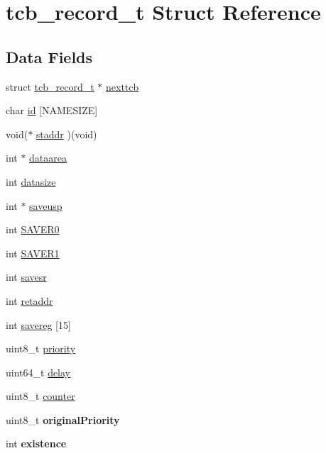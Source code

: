 \hypertarget{structtcb__record__t}{}\section{tcb\+\_\+record\+\_\+t Struct Reference}
\label{structtcb__record__t}
\subsection*{Data Fields}
\begin{DoxyCompactItemize}
\item 
struct \hyperlink{structtcb__record__t}{tcb\+\_\+record\+\_\+t} $\ast$ \hyperlink{structtcb__record__t_abe5f58939c000c4f6b06c911bead561c}{nexttcb}
\item 
char \hyperlink{structtcb__record__t_aa25efaaaecf8c7c4d679dbc94aec3031}{id} \mbox{[}N\+A\+M\+E\+S\+I\+Z\+E\mbox{]}
\item 
void($\ast$ \hyperlink{structtcb__record__t_a99e7583ffff142dbd9efb8d9c1d8ebde}{staddr} )(void)
\item 
int $\ast$ \hyperlink{structtcb__record__t_a994219890a698cd01cb7a730d0b34a5a}{dataarea}
\item 
int \hyperlink{structtcb__record__t_aceef3706b1186c624f339e303d4ae373}{datasize}
\item 
int $\ast$ \hyperlink{structtcb__record__t_ad2fffaf0f5616d3f34ab2336a25a9186}{saveusp}
\item 
int \hyperlink{structtcb__record__t_a753e67212cb8cd447171d33a8e75c11e}{S\+A\+V\+E\+R0}
\item 
int \hyperlink{structtcb__record__t_a1137e438d580c22c21044a334356b696}{S\+A\+V\+E\+R1}
\item 
int \hyperlink{structtcb__record__t_a4b57f27f8be80d5cedeb6e3a7a759d18}{savesr}
\item 
int \hyperlink{structtcb__record__t_a3a7c64427bddbb6ef8ac755f2782baf7}{retaddr}
\item 
int \hyperlink{structtcb__record__t_a22aa27436be4418c5ad79657a2128b0e}{savereg} \mbox{[}15\mbox{]}
\item 
uint8\+\_\+t \hyperlink{structtcb__record__t_a6a5183df4c54c3e28dc8dc704f2487d5}{priority}
\item 
uint64\+\_\+t \hyperlink{structtcb__record__t_a5b1f6f1eaa44ff5c4f80c23687f4f324}{delay}
\item 
uint8\+\_\+t \hyperlink{structtcb__record__t_a61f7b3cbcedea4bae0c663c892d5d07f}{counter}
\item 
\hypertarget{structtcb__record__t_a6cf25c65c6d8a6fad1172539d85d0304}{}uint8\+\_\+t {\bfseries original\+Priority}\label{structtcb__record__t_a6cf25c65c6d8a6fad1172539d85d0304}

\item 
\hypertarget{structtcb__record__t_a971e6df5ab0b7361ea576aa05a8e8cf1}{}int {\bfseries existence}\label{structtcb__record__t_a971e6df5ab0b7361ea576aa05a8e8cf1}

\end{DoxyCompactItemize}


